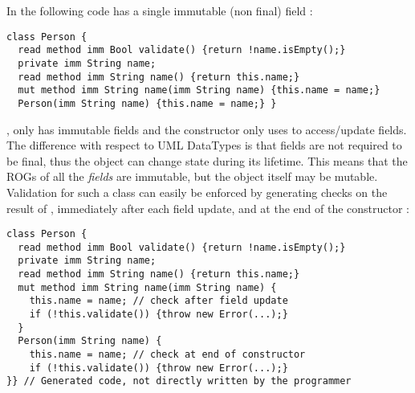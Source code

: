 In the following code \Q@Person@ has a single immutable (non final) field \Q@name@:
\begin{lstlisting}
class Person {
  read method imm Bool validate() {return !name.isEmpty();}
  private imm String name;
  read method imm String name() {return this.name;}
  mut method imm String name(imm String name) {this.name = name;}
  Person(imm String name) {this.name = name;} }
\end{lstlisting}
\Q@Person@, only has immutable fields and the constructor only uses \Q@this@ to access/update fields.%
The difference with respect to UML DataTypes 
 is that fields are not required to be final, thus the object can change state during its lifetime. This means that the ROGs of all the \emph{fields} are immutable, but the object itself may be mutable.
Validation for such a class can easily be enforced by generating checks on the result of \validate, immediately after each field update, and at the end of the constructor%
:

\begin{lstlisting}
class Person {
  read method imm Bool validate() {return !name.isEmpty();}
  private imm String name;
  read method imm String name() {return this.name;}
  mut method imm String name(imm String name) {
    this.name = name; // check after field update
    if (!this.validate()) {throw new Error(...);} 
  }
  Person(imm String name) {
    this.name = name; // check at end of constructor
    if (!this.validate()) {throw new Error(...);}
}} // Generated code, not directly written by the programmer
\end{lstlisting}

